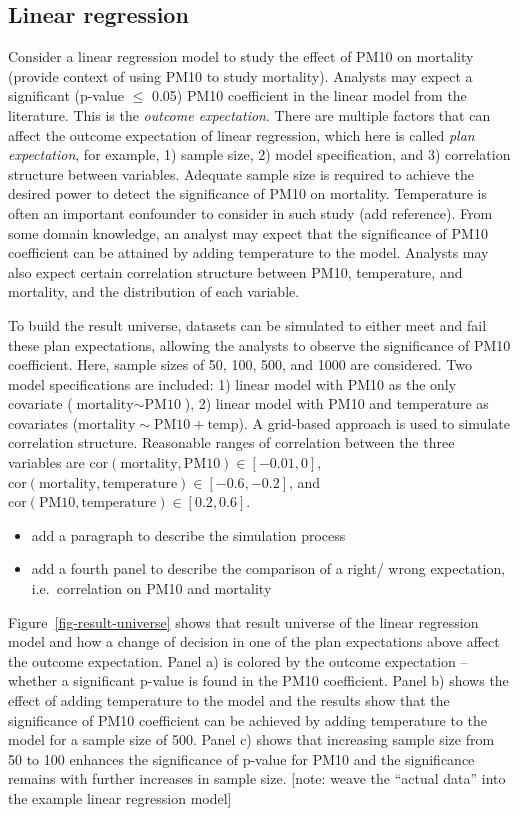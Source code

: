 \documentclass[
]{jds}
\begin{document}
\subsection{Linear regression}\label{sec-linear-reg}

Consider a linear regression model to study the effect of PM10 on
mortality (provide context of using PM10 to study mortality). Analysts
may expect a significant (p-value \(\le\) 0.05) PM10 coefficient in the
linear model from the literature. This is the \emph{outcome
expectation}. There are multiple factors that can affect the outcome
expectation of linear regression, which here is called \emph{plan
expectation}, for example, 1) sample size, 2) model specification, and
3) correlation structure between variables. Adequate sample size is
required to achieve the desired power to detect the significance of PM10
on mortality. Temperature is often an important confounder to consider
in such study (add reference). From some domain knowledge, an analyst
may expect that the significance of PM10 coefficient can be attained by
adding temperature to the model. Analysts may also expect certain
correlation structure between PM10, temperature, and mortality, and the
distribution of each variable.

To build the result universe, datasets can be simulated to either meet
and fail these plan expectations, allowing the analysts to observe the
significance of PM10 coefficient. Here, sample sizes of 50, 100, 500,
and 1000 are considered. Two model specifications are included: 1)
linear model with PM10 as the only covariate
(\(\text{mortality} \sim \text{PM10}\)), 2) linear model with PM10 and
temperature as covariates
(\(\text{mortality} \sim \text{PM10} + \text{temp}\)). A grid-based
approach is used to simulate correlation structure. Reasonable ranges of
correlation between the three variables are
\(\text{cor}(\text{mortality}, \text{PM10}) \in [-0.01, 0]\),
\(\text{cor}(\text{mortality}, \text{temperature}) \in [-0.6, -0.2]\),
and \(\text{cor}(\text{PM10}, \text{temperature}) \in [0.2, 0.6]\).

\begin{itemize}
\item
  add a paragraph to describe the simulation process
\item
  add a fourth panel to describe the comparison of a right/ wrong
  expectation, i.e.~correlation on PM10 and mortality
\end{itemize}

Figure~\ref{fig-result-universe} shows that result universe of the
linear regression model and how a change of decision in one of the plan
expectations above affect the outcome expectation. Panel a) is colored
by the outcome expectation -- whether a significant p-value is found in
the PM10 coefficient. Panel b) shows the effect of adding temperature to
the model and the results show that the significance of PM10 coefficient
can be achieved by adding temperature to the model for a sample size of
500. Panel c) shows that increasing sample size from 50 to 100 enhances
the significance of p-value for PM10 and the significance remains with
further increases in sample size. {[}note: weave the ``actual data''
into the example linear regression model{]}
\end{document}
